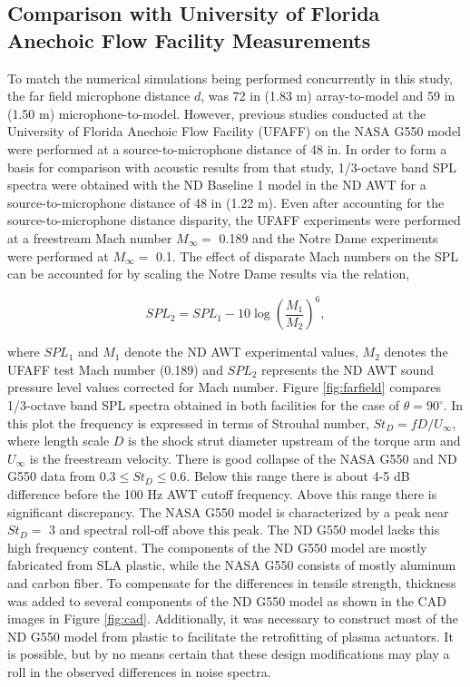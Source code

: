 \subsection{Comparison with University of Florida Anechoic Flow Facility Measurements}
To match the numerical simulations being performed concurrently in this study, the far field microphone distance $d$, was 72 in (1.83 m) array-to-model and 59 in (1.50 m) microphone-to-model. However, previous studies conducted at the University of Florida Anechoic Flow Facility (UFAFF) on the NASA G550 model were performed at a source-to-microphone distance of 48 in. In order to form a basis for comparison with acoustic results from that study, 1/3-octave band SPL spectra were obtained with the ND Baseline 1 model in the ND AWT for a source-to-microphone distance of 48 in (1.22 m). Even after accounting for the source-to-microphone distance disparity, the UFAFF experiments were performed at a freestream Mach number $M_\infty =$ 0.189 and the Notre Dame experiments were performed at $M_\infty=$ 0.1. The effect of disparate Mach numbers on the SPL can be accounted for by scaling the Notre Dame results via the relation, 

\begin{equation}
SPL_2 = SPL_1 - 10 \log \left( \frac{M_1}{M_2} \right)^6,
\end{equation}

where $SPL_1$ and $M_1$ denote the ND AWT experimental values, $M_2$ denotes the UFAFF test Mach number (0.189) and $SPL_2$ represents the ND AWT sound pressure level values corrected for Mach number. Figure \ref{fig:farfield} compares 1/3-octave band SPL spectra obtained in both facilities for the case of $\theta = 90^\circ$. In this plot the frequency is expressed in terms of Strouhal number, $St_D = f D / U_\infty$, where length scale $D$ is the shock strut diameter upstream of the torque arm and $U_\infty$ is the freestream velocity.
There is good collapse of the NASA G550 and ND G550 data from $0.3 \leq St_D \leq 0.6$. Below this range there is about 4-5 dB difference before the 100 Hz AWT cutoff frequency. Above this range there is significant discrepancy. The NASA G550 model is characterized by a peak near $St_D=$ 3 and spectral roll-off above this peak. The ND G550 model lacks this high frequency content. The components of the ND G550 model are mostly fabricated from SLA plastic, while the NASA G550 consists of mostly aluminum and carbon fiber. To compensate for the differences in tensile strength, thickness was added to several components of the ND G550 model as shown in the CAD images in Figure \ref{fig:cad}. Additionally, it was necessary to construct most of the ND G550 model from plastic to facilitate the retrofitting of plasma actuators. It is possible, but by no means certain that these design modifications may play a roll in the observed differences in noise spectra.

